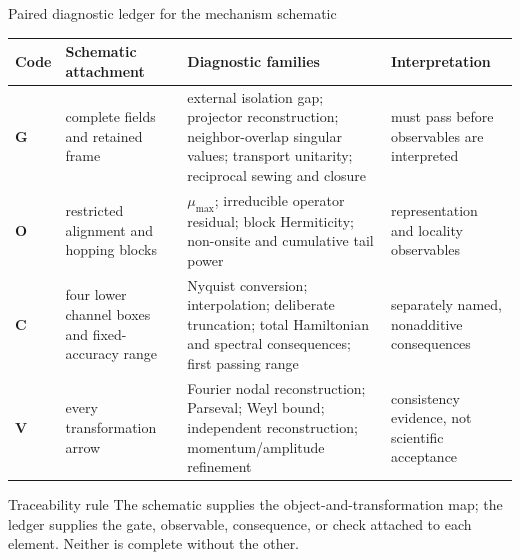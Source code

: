 \documentclass[aspectratio=169,10pt]{beamer}
\begin{document}
\begin{frame}{Paired diagnostic ledger for the mechanism schematic}
  \scriptsize
  \begin{tabular}{p{}p{}p{}p{}}
    \toprule
    Code & Schematic attachment & Diagnostic families & Interpretation\\
    \midrule
    \textbf{G}
      & complete fields and retained frame
      & external isolation gap; projector reconstruction; neighbor-overlap singular values;
        transport unitarity; reciprocal sewing and closure
      & must pass before observables are interpreted\\[0.7em]
    \textbf{O}
      & restricted alignment and hopping blocks
      & $\mu_{\max}$; irreducible operator residual; block Hermiticity; non-onsite and
        cumulative tail power
      & representation and locality observables\\[0.7em]
    \textbf{C}
      & four lower channel boxes and fixed-accuracy range
      & Nyquist conversion; interpolation; deliberate truncation; total Hamiltonian and
        spectral consequences; first passing range
      & separately named, nonadditive consequences\\[0.7em]
    \textbf{V}
      & every transformation arrow
      & Fourier nodal reconstruction; Parseval; Weyl bound; independent reconstruction;
        momentum/amplitude refinement
      & consistency evidence, not scientific acceptance\\
    \bottomrule
  \end{tabular}

  \vspace{0.35em}
  \begin{block}{Traceability rule}
    The schematic supplies the object-and-transformation map; the ledger supplies the
    gate, observable, consequence, or check attached to each element. Neither is complete
    without the other.
  \end{block}
\end{frame}
\end{document}
